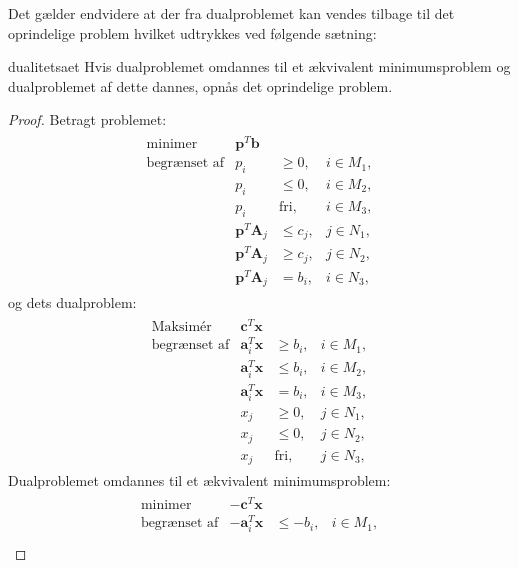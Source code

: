 Det gælder endvidere at der fra dualproblemet kan vendes tilbage til det oprindelige problem hvilket udtrykkes ved følgende sætning:
\begin{thm}{}{dualitetsaet}
Hvis dualproblemet omdannes til et ækvivalent minimumsproblem og dualproblemet af dette dannes, opnås det oprindelige problem.
\end{thm}
\begin{proof}
Betragt problemet:
\begin{align*}
\begin{array}{lrll}
\text{minimer}		&\textbf{p}^T\textbf{b}	&			&\\
\text{begrænset af}	&p_i					&\geq 0,	&i \in M_1,\\
					&p_i					&\leq 0,	&i \in M_2,\\
					&p_i					&\text{fri},	&i \in M_3,\\
					&\textbf{p}^T\textbf{A}_j	&\leq c_j,	&j \in N_1,\\
					&\textbf{p}^T\textbf{A}_j	&\geq c_j,	&j \in N_2,\\
					&\textbf{p}^T\textbf{A}_j	& = b_i,	&i \in N_3,
\end{array}
\end{align*}
og dets dualproblem:
\begin{align*}
\begin{array}{lrll}
\text{Maksimér}		&\textbf{c}^T\textbf{x}	&			&\\
\text{begrænset af}	&\textbf{a}_i^T\textbf{x}	&\geq b_i,	&i \in M_1,\\
					&\textbf{a}_i^T\textbf{x}	&\leq b_i,	&i \in M_2,\\
					&\textbf{a}_i^T\textbf{x}	& = b_i,	&i \in M_3,\\
					&x_j					&\geq 0,	&j \in N_1,\\
					&x_j					&\leq 0,	&j \in N_2,\\							&x_j					&\text{fri},	&j \in N_3,
\end{array}
\end{align*}
Dualproblemet omdannes til et ækvivalent minimumsproblem:
\begin{align*}
\begin{array}{lrll}
\text{minimer}		&-\textbf{c}^T\textbf{x}	&			&\\
\text{begrænset af}	&-\textbf{a}_i^T\textbf{x}	&\leq -b_i,	&i \in M_1,\\

\end{array}
\end{align*}
\end{proof}
